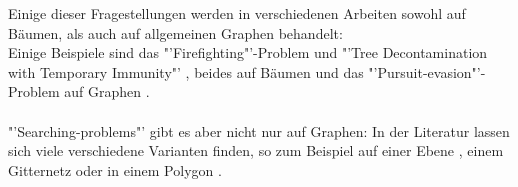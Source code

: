 Einige dieser Fragestellungen werden in verschiedenen Arbeiten sowohl auf Bäumen, als auch auf allgemeinen Graphen behandelt:\\
Einige Beispiele sind das "'Firefighting"'-Problem und "'Tree Decontamination with Temporary Immunity"' \cite{tdti_paper}, beides auf Bäumen \cite{firefighterproblem_paper} und das "'Pursuit-evasion"'-Problem auf Graphen \cite{graph_paper_76}.
\\
\\
"'Searching-problems"' gibt es aber nicht nur auf Graphen: In der Literatur lassen sich viele verschiedene  Varianten finden, so zum Beispiel auf einer Ebene \cite{klein_paper}, einem Gitternetz \cite{grid_paper_96} oder in einem Polygon \cite{polygon_paper}.

